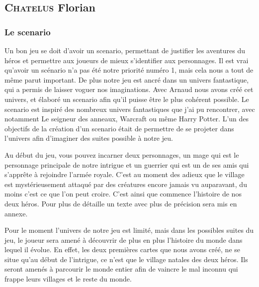 \documentclass[a4paper, 12pt]{article}
\begin{document}
	\subsection{\textsc{Chatelus} Florian}
		\subsubsection{Le scenario}
		Un bon jeu se doit d’avoir un scenario, permettant de justifier les aventures du héros et permettre aux joueurs de mieux s’identifier aux personnages. Il est vrai qu’avoir un scénario n’a pas été notre priorité numéro 1, mais cela nous a tout de même parut important. De plus notre jeu est ancré dans un univers fantastique, qui a permis de laisser voguer nos imaginations. Avec Arnaud nous avons créé cet univers, et élaboré un scenario afin qu’il puisse être le plus cohérent possible. Le scenario est inspiré des nombreux univers fantastiques que j’ai pu rencontrer, avec notamment Le seigneur des anneaux, Warcraft ou même Harry Potter. L’un des objectifs de la création d’un scenario était de permettre de se projeter dans l’univers afin d’imaginer des suites possible à notre jeu.
\par Au début du jeu, vous pouvez incarner deux personnages, un mage qui est le personnage principale de notre intrigue et un guerrier qui est un de ses amis qui s’apprête à rejoindre l’armée royale. C’est au moment des adieux que le village est mystérieusement  attaqué par des créatures encore jamais vu auparavant, du moins c’est ce que l’on peut croire. C’est ainsi que commence l’histoire de nos deux héros. Pour plus de détaille un texte avec plus de précision sera mis en annexe.
\par Pour le moment l’univers de notre jeu est limité, mais dans les possibles suites du jeu, le joueur sera amené à découvrir de plus en plus l’histoire du monde dans lequel il évolue. En effet, les deux premières cartes que nous avons créé, ne se situe qu’au début de l’intrigue, ce n’est que le village natales des deux héros. Ils seront amenés à parcourir le monde entier afin de vaincre le mal inconnu qui frappe leurs villages et le reste du monde.
\end{document}
